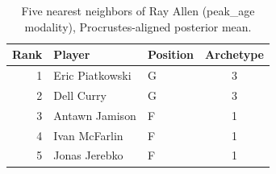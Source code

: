 \begin{table}[htbp]
  \centering\small
  \begin{tabular}{rllc}
    \toprule
    Rank & Player & Position & Archetype \\
    \midrule
    1 & Eric Piatkowski & G & 3 \\
    2 & Dell Curry & G & 3 \\
    3 & Antawn Jamison & F & 1 \\
    4 & Ivan McFarlin & F & 1 \\
    5 & Jonas Jerebko & F & 1 \\
    \bottomrule
  \end{tabular}
  \caption{Five nearest neighbors of Ray Allen (peak_age modality), Procrustes-aligned posterior mean.}
  \label{tab:Ray_Allen_neighbors_peak_age}
\end{table}

